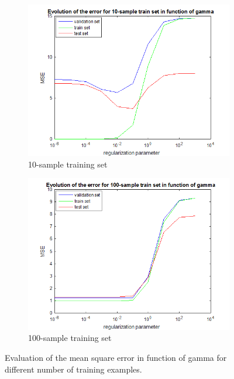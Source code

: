 \documentclass{article} %
\begin{document}
\begin{figure}[h]
    \centering
    \begin{subfigure}[b]{0.3\textwidth}
        \includegraphics[width=\textwidth]{ex6_10}
        \caption{10-sample training set}
    \end{subfigure}
    \begin{subfigure}[b]{0.3\textwidth}
        \includegraphics[width=\textwidth]{ex6_100}
        \caption{100-sample training set}
    \end{subfigure}
    \caption{Evaluation of the mean square error in function of gamma for different number of training examples.}
    \label{fig:ex6}
\end{figure}
\end{document}
